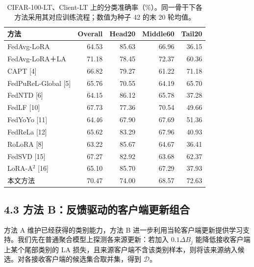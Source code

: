 \documentclass[10pt,twocolumn,letterpaper]{article}
\begin{document}
\begin{table}[t]\centering\caption{CIFAR-100-LT、Client-LT 上的分类准确率（\%）。同一骨干下各方法采用其对应训练流程；数值为种子 42 的末 20 轮均值。}\small\setlength{\tabcolsep}{3pt}

\begin{tabular*}{\textwidth}{@{\extracolsep{\fill}}lrrrr@{}}\toprule 方法 & Overall & Head20 & Middle60 & Tail20 \\\midrule

FedAvg-LoRA & 64.53 & 85.63 & 66.96 & 36.15 \\

FedAvg-LoRA＋LA & 71.18 & 78.45 & 72.37 & 60.36 \\

CAPT [4] & 66.82 & 79.27 & 61.22 & 71.18 \\

FedPuReL-Global [5] & 65.76 & 70.55 & 64.19 & 65.70 \\

FedNTD [6] & 64.15 & 86.12 & 65.78 & 37.28 \\

FedLF [10] & 67.73 & 77.36 & 70.54 & 49.66 \\

FedYoYo [11] & 64.46 & 67.90 & 67.69 & 51.36 \\

FedReLa [12] & 65.62 & 83.29 & 67.96 & 40.93 \\

RoLoRA [8] & 63.22 & 85.67 & 64.67 & 36.41 \\

FedSVD [15] & 67.27 & 82.92 & 63.68 & 62.37 \\

LoRA-A$^2$ [16] & 65.10 & 85.70 & 67.29 & 37.93 \\

本文方法 & 70.47 & 74.00 & 68.57 & 72.63 \\

\bottomrule\end{tabular*}\end{table}

\subsection*{4.3 方法 B：反馈驱动的客户端更新组合}

方法 A 维护已经获得的类别能力，方法 B 进一步利用当轮客户端更新提供学习支持。我们先在普通聚合模型上探测各来源更新：若加入 $0.1\Delta B_j$ 能降低接收客户端上某个尾部类别的 LA 损失，且来源客户端不含该类别样本，则将该来源纳入候选。对各接收客户端的候选集合取并集，得到 $\mathcal D$。
\end{document}
